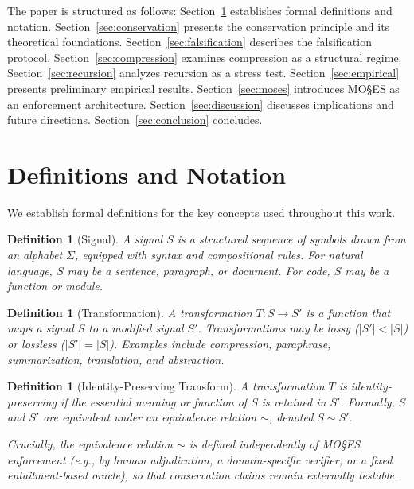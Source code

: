 \documentclass[11pt,a4paper]{article}
\newtheorem{definition}[theorem]{Definition}
\begin{document}
The paper is structured as follows: Section~\ref{sec:definitions} establishes formal definitions and notation. Section~\ref{sec:conservation} presents the conservation principle and its theoretical foundations. Section~\ref{sec:falsification} describes the falsification protocol. Section~\ref{sec:compression} examines compression as a structural regime. Section~\ref{sec:recursion} analyzes recursion as a stress test. Section~\ref{sec:empirical} presents preliminary empirical results. Section~\ref{sec:moses} introduces MO\S{}ES\texttrademark{} as an enforcement architecture. Section~\ref{sec:discussion} discusses implications and future directions. Section~\ref{sec:conclusion} concludes.

\section{Definitions and Notation}
\label{sec:definitions}

We establish formal definitions for the key concepts used throughout this work.

\begin{definition}[Signal]
A signal $S$ is a structured sequence of symbols drawn from an alphabet $\Sigma$, equipped with syntax and compositional rules. For natural language, $S$ may be a sentence, paragraph, or document. For code, $S$ may be a function or module.
\end{definition}

\begin{definition}[Transformation]
A transformation $T: S \rightarrow S'$ is a function that maps a signal $S$ to a modified signal $S'$. Transformations may be lossy ($|S'| < |S|$) or lossless ($|S'| = |S|$). Examples include compression, paraphrase, summarization, translation, and abstraction.
\end{definition}

\begin{definition}[Identity-Preserving Transform]
A transformation $T$ is identity-preserving if the essential meaning or function of $S$ is retained in $S'$. Formally, $S$ and $S'$ are equivalent under an equivalence relation $\sim$, denoted $S \sim S'$.

Crucially, the equivalence relation $\sim$ is defined independently of MO\S{}ES\texttrademark{} enforcement (e.g., by human adjudication, a domain-specific verifier, or a fixed entailment-based oracle), so that conservation claims remain externally testable.
\end{definition}
\end{document}
